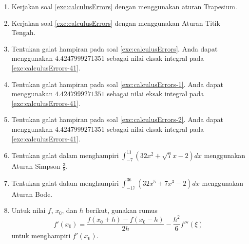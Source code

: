 \begin{small}
\begin{enumerate}
\begin{enumerate}
\item \label{exc:calculusErrors-5}${\displaystyle \int_{-0.5}^{0}x\ln(x+1)dx}$ \hasasolution 
\item $\int_{1}^{3}\ln(x+1)\,dx$
\item \label{exc:calculusErrors-6}${\displaystyle \int_{-0.25}^{0.25}(\cos x)^{2}dx}$ \hasananswer 
\item \label{exc:calculusErrors-41}$\int_{1}^{3}e^{\sin x}\:dx$
\item \label{exc:calculusErrors-7}$\int_{1}^{2}x^{4}\,dx$ \hasananswer 
\end{enumerate}
\item \label{exc:calculusErrors-1}Kerjakan soal \ref{exc:calculusErrors}
dengan menggunakan aturan Trapesium. \haspartwithsolution \haspartwithanswer 
\item \label{exc:calculusErrors-2}Kerjakan soal \ref{exc:calculusErrors}
dengan menggunakan Aturan Titik Tengah. \haspartwithsolution \haspartwithanswer 
\item \label{exc:calculusErrors-37}Tentukan galat hampiran pada soal \ref{exc:calculusErrors}.
Anda dapat menggunakan $4.4247999271351$ sebagai nilai eksak integral
pada \ref{exc:calculusErrors-41}. \haspartwithsolution \haspartwithanswer 
\item \label{exc:calculusErrors-38}Tentukan galat hampiran pada soal \ref{exc:calculusErrors-1}.
Anda dapat menggunakan $4.4247999271351$ sebagai nilai eksak integral
pada \ref{exc:calculusErrors-41}. \haspartwithsolution \haspartwithanswer 
\item \label{exc:calculusErrors-39}Tentukan galat hampiran pada soal \ref{exc:calculusErrors-2}.
Anda dapat menggunakan $4.4247999271351$ sebagai nilai eksak integral
pada \ref{exc:calculusErrors-41}. \haspartwithsolution \haspartwithanswer 
\item Tentukan galat dalam menghampiri $\int_{-7}^{11}(32x^{2}+\sqrt{7}x-2)dx$
menggunakan Aturan Simpson $\frac{3}{8}$.
\item \label{exc:calculusErrors-19}Tentukan galat dalam menghampiri $\int_{-17}^{36}(32x^{5}+7x^{3}-2)dx$
menggunakan Aturan Bode. \hasananswer 
\item \label{exc:calculusErrors-3}Untuk nilai $f$, $x_{0}$, dan $h$
berikut, gunakan rumus 
\[
f'(x_{0})=\frac{f(x_{0}+h)-f(x_{0}-h)}{2h}-\frac{h^{2}}{6}f'''(\xi)
\]
untuk menghampiri $f'(x_{0})$.


\end{enumerate}
\end{small}
